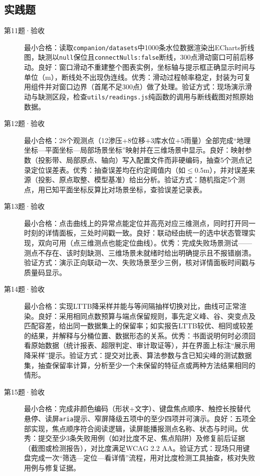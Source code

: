 \subsection*{实践题}
\begin{description}
  \item[第11题·验收] 最小合格：读取\texttt{companion/datasets}中1000条水位数据渲染出ECharts折线图，缺测以\texttt{null}保位且\texttt{connectNulls:false}断线，300点滑动窗口可前后移动。良好：窗口滑动不重建整个图表实例，坐标轴与提示框正确显示时间与单位（m），断线处不出现伪连线。优秀：滑动过程帧率稳定，封装为可复用组件并对窗口边界（首尾不足300点）做了处理。验证方式：现场演示滑动与缺测区段，检查\texttt{utils/readings.js}纯函数的调用与断线截图对照原始数据。
  \item[第12题·验收] 最小合格：28个观测点（12渗压+8位移+3库水位+5雨量）全部完成“地理坐标—平面坐标—局部场景坐标”映射并在三维场景中显示。良好：映射参数（投影带、局部原点、轴向）写入配置文件而非硬编码，抽查5个测点记录定位误差表。优秀：抽查误差均在约定阈值内（如$\leq 0.5$m），并对误差来源（投影、原点取整、模型基准）给出分析。验证方式：随机指定5个测点，用已知平面坐标反算比对场景坐标，查验误差记录表。
  \item[第13题·验收] 最小合格：点击曲线上的异常点能定位并高亮对应三维测点，同时打开同一时刻的详情面板，三处时间戳一致。良好：联动经由统一的选中状态管理实现，双向可用（点三维测点也能定位曲线）。优秀：完成失败场景测试——测点不存在、该时刻缺测、三维场景未就绪时给出明确提示且不报错崩溃。验证方式：演示正向联动一次、失败场景至少三例，核对详情面板时间戳与质量码显示。
  \item[第14题·验收] 最小合格：实现LTTB降采样并能与等间隔抽样切换对比，曲线可正常渲染。良好：采用相同点数预算与端点保留规则，事先定义峰、谷、突变点及匹配容差，给出同一数据集上的保留率；如实报告LTTB较优、相同或较差的结果，并解释与分桶位置、数据形态的关系。优秀：书面说明何时必须回看原始数据（统计报表、超限判定、审计取证等），并在界面上标注“展示用降采样”提示。验证方式：提交对比表、算法参数与含已知尖峰的测试数据集，抽查保留率计算，分析至少一个未保留的特征点或两种方法结果相同的情形。
  \item[第15题·验收] 最小合格：完成非颜色编码（形状+文字）、键盘焦点顺序、触控长按替代悬停、读屏\texttt{aria}提示、窄屏降级五项中的至少四项并可演示。良好：五项全部实现，焦点顺序符合阅读逻辑，读屏能播报测点名称、状态与时间。优秀：提交至少3条失败用例（如对比度不足、焦点陷阱）及修复前后证据（截图或检测报告），对比度满足WCAG 2.2 AA。验证方式：现场只用键盘完成一次“筛选—定位—看详情”流程，用对比度检测工具抽查，核对失败用例与修复证据。
\end{description}

